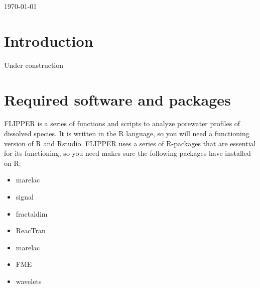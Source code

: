 \documentclass[10pt]{article}
\begin{document}
\begin{titlepage}



\vspace{2cm}
{\large \today}\\[3cm] %

 

\vfill %

\end{titlepage}
\setcounter{tocdepth}{3}
\tableofcontents
\pagebreak
\setcounter{page}{1}


\section{Introduction}

Under construction

\section{Required software and packages}
\label{sect_software}

FLIPPER is a series of functions and scripts to analyze porewater profiles of dissolved species. It is written in the R language, so you will need a functioning version of R and Rstudio. FLIPPER uses a series of R-packages that are essential for its functioning, so you need makes sure the following packages have installed on R:
\begin{itemize}
\item marelac
\item signal
\item fractaldim
\item ReacTran
\item marelac
\item FME
\item wavelets
\end{itemize}
\end{document}
